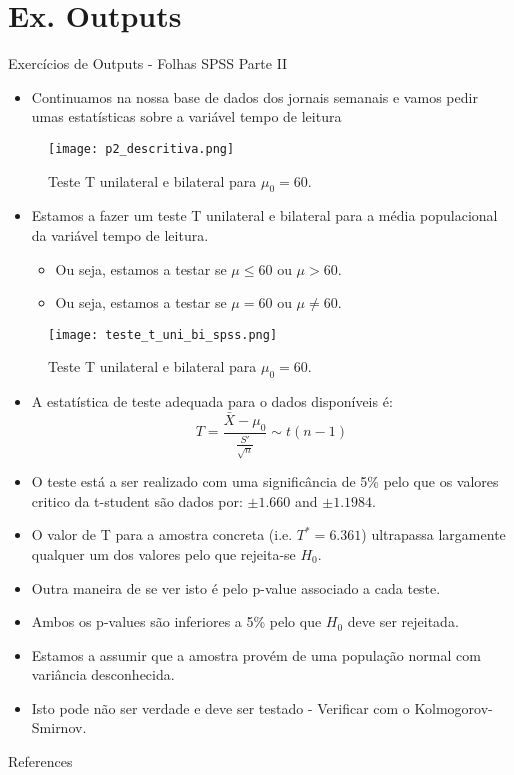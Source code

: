 \documentclass[10,5pt, pdf]{beamer}
\begin{document}
\section{Ex. Outputs}\label{sec:outputs}
\begin{frame}[allowframebreaks]{Exercícios de Outputs - Folhas SPSS Parte II}
\begin{itemize}
    \item{Continuamos na nossa base de dados dos jornais semanais e vamos pedir umas estatísticas sobre a variável tempo de leitura}
\end{itemize}
\begin{figure}
    \centering
    \texttt{[image: p2\_descritiva.png]}
    \caption{Teste T unilateral e bilateral para $\mu_0=60$.}
    \label{fig:t-test}
\end{figure}
\begin{itemize}
    \item{Estamos a fazer um teste T unilateral e bilateral para a média populacional da variável tempo de leitura.} 
    \begin{itemize}
        \item{Ou seja, estamos a testar se $\mu\leq60$ ou $\mu>60$.}
        \item{Ou seja, estamos a testar se $\mu=60$ ou $\mu\neq60$.}
    \end{itemize}
\end{itemize}
\begin{figure}
    \centering
    \texttt{[image: teste\_t\_uni\_bi\_spss.png]}
    \caption{Teste T unilateral e bilateral para $\mu_0=60$.}
    \label{fig:t-test}
\end{figure}
\begin{itemize}
    \item{A estatística de teste adequada para o dados disponíveis é:}
    \begin{equation}
        T=\frac{\bar{X}-\mu_0}{\frac{S'}{\sqrt{n}}}\sim t(n-1)
    \end{equation}
    \item{O teste está a ser realizado com uma significância de 5\% pelo que os valores critico da t-student são dados por: $\pm1.660$ and $\pm1.1984$.}
    \item{O valor de T para a amostra concreta (i.e. $T^*=6.361$) ultrapassa largamente qualquer um dos valores pelo que rejeita-se $H_0$.}
    \item{Outra maneira de se ver isto é pelo p-value associado a cada teste.}
    \item{Ambos os p-values são inferiores a 5\% pelo que $H_0$ deve ser rejeitada.}
    \item{Estamos a assumir que a amostra provém de uma população normal com variância desconhecida.}
    \item{Isto pode não ser verdade e deve ser testado - Verificar com o Kolmogorov-Smirnov.}
\end{itemize}
\end{frame}









\begin{frame}[allowframebreaks]{References}
\nocite{*}


\end{frame}


\end{document}
